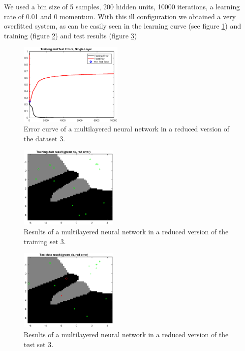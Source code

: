 \documentclass{article}
\begin{document}
We used a bin size of 5 samples, 200 hidden units, 10000 iterations, a learning rate of 0.01 and 0 momentum. With this ill configuration we obtained a very overfitted system, as can be easily seen in the learning curve (see figure \ref{fig:overfit_error}) and training (figure \ref{fig:overfit_result_train}) and test results (figure \ref{fig:overfit_result_test})

\begin{figure}[H]
\centering
\includegraphics[height=4cm]{images/overfit_error}
\caption{Error curve of a multilayered neural network in a reduced version of the dataset 3.}
\label{fig:overfit_error}
\end{figure}

\begin{figure}[H]
\centering
\includegraphics[height=4cm]{images/overfit_result_train}
\caption{Results of a multilayered neural network in a reduced version of the training set 3.}
\label{fig:overfit_result_train}
\end{figure}

\begin{figure}[H]
\centering
\includegraphics[height=4cm]{images/overfit_result_test}
\caption{Results of a multilayered neural network in a reduced version of the test set 3.}
\label{fig:overfit_result_test}
\end{figure}
\end{document}
